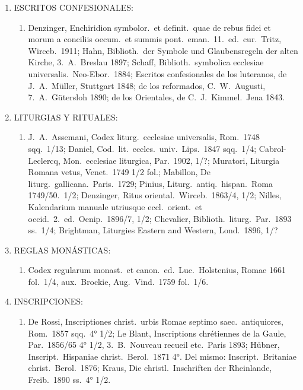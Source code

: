 \raggedbottom{} \documentclass[12pt, a4paper]{book}
\begin{document}
\begin{enumerate}
\begin{enumerate}
        \end{enumerate}
  \item ESCRITOS CONFESIONALES:\@ \begin{enumerate}
          \item Denzinger, Enchiridion symbolor.\ et definit.\ quae de rebus fidei et morum a conciliis oecum.\ et summis pont.\ eman.\ 11.\ ed.\ cur.\ Tritz, Wirceb.\ 1911; Hahn, Biblioth.\ der Symbole und Glaubensregeln der alten Kirche, 3.\ A.\ Breslau 1897; Schaff, Biblioth.\ symbolica ecclesiae universalis.\ Neo-Ebor.\ 1884; Escritos confesionales de los luteranos, de J.\ A.\ Müller, Stuttgart 1848; de los reformados, C.\ W.\ Augusti, 7.\ A.\ Gütersloh 1890; de los Orientales, de C.\ J.\ Kimmel.\ Jena 1843.
        \end{enumerate}
  \item LITURGIAS Y RITUALES:\@ \begin{enumerate}
          \item J.\ A.\ Assemani, Codex liturg.\ ecclesiae universalis, Rom.\ 1748 sqq.\ 1/13; Daniel, Cod.\ lit.\ eccles.\ univ.\ Lips.\ 1847 sqq.\ 1/4; Cabrol-Leclercq, Mon.\ ecclesiae liturgica, Par.\ 1902, 1/?; Muratori, Liturgia Romana vetus, Venet.\ 1749 1/2 fol.; Mabillon, De liturg.\ gallicana.\ Paris.\ 1729; Pinius, Liturg.\ antiq.\ hispan.\ Roma 1749/50.\ 1/2; Denzinger, Ritus oriental.\ Wirceb.\ 1863/4, 1/2; Nilles, Kalendarium manuale utriusque eccl.\ orient.\ et occid.\ 2.\ ed.\ Oenip.\ 1896/7, 1/2; Chevalier, Biblioth.\ liturg.\ Par.\ 1893 ss.\ 1/4; Brightman, Liturgies Eastern and Western, Lond.\ 1896, 1/?
        \end{enumerate}
  \item REGLAS MONÁSTICAS:\@ \begin{enumerate}
          \item Codex regularum monast.\ et canon.\ ed.\ Luc.\ Holstenius, Romae 1661 fol.\ 1/4, aux.\ Brockie, Aug.\ Vind.\ 1759 fol.\ 1/6.
        \end{enumerate}
  \item INSCRIPCIONES:\@ \begin{enumerate}
          \item De Rossi, Inscriptiones christ.\ urbis Romae septimo saec.\ antiquiores, Rom.\ 1857 sqq.\ 4° 1/2; Le Blant, Inscriptions chrétiennes de la Gaule, Par.\ 1856/65 4° 1/2, 3.\ B.\ Nouveau recueil etc.\ Paris 1893; Hübner, Inscript.\ Hispaniae christ.\ Berol.\ 1871 4°. Del mismo: Inscript.\ Britaniae christ.\ Berol.\ 1876; Kraus, Die christl.\ Inschriften der Rheinlande, Freib.\ 1890 ss.\ 4° 1/2.

\end{enumerate}
\end{enumerate}
\end{document}
